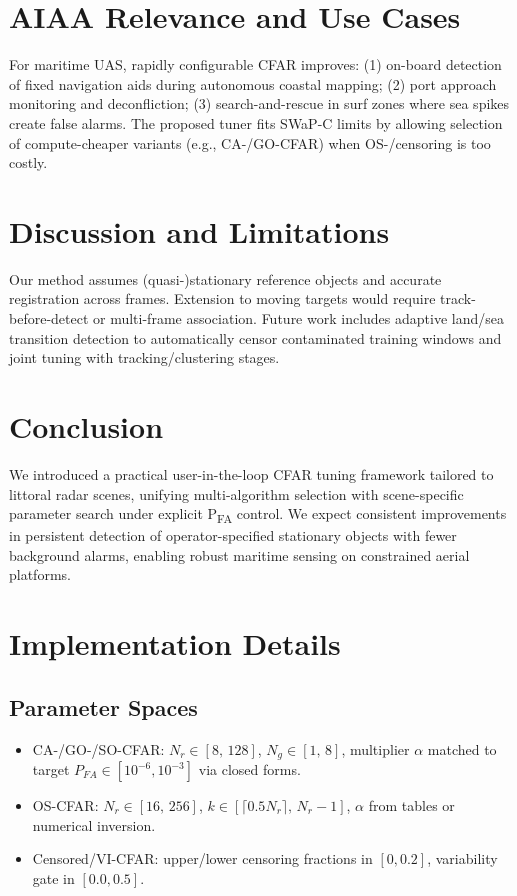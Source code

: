 \documentclass[10pt,letterpaper]{article}
\begin{document}
\section{AIAA Relevance and Use Cases}
For maritime UAS, rapidly configurable CFAR improves: (1) on-board detection of fixed navigation aids during autonomous coastal mapping; (2) port approach monitoring and deconfliction; (3) search-and-rescue in surf zones where sea spikes create false alarms. The proposed tuner fits SWaP-C limits by allowing selection of compute-cheaper variants (e.g., CA-/GO-CFAR) when OS-/censoring is too costly.

\section{Discussion and Limitations}
Our method assumes (quasi-)stationary reference objects and accurate registration across frames. Extension to moving targets would require track-before-detect or multi-frame association. Future work includes adaptive land/sea transition detection to automatically censor contaminated training windows and joint tuning with tracking/clustering stages.

\section{Conclusion}
We introduced a practical user-in-the-loop CFAR tuning framework tailored to littoral radar scenes, unifying multi-algorithm selection with scene-specific parameter search under explicit P\textsubscript{FA} control. We expect consistent improvements in persistent detection of operator-specified stationary objects with fewer background alarms, enabling robust maritime sensing on constrained aerial platforms.

\appendix
\section{Implementation Details}
\subsection{Parameter Spaces}
\begin{itemize}
  \item CA-/GO-/SO-CFAR: $N_r\in[8,\,128]$, $N_g\in[1,\,8]$, multiplier $\alpha$ matched to target $P_{FA} \in [10^{-6},10^{-3}]$ via closed forms.
  \item OS-CFAR: $N_r\in[16,\,256]$, $k\in[\lceil0.5N_r\rceil,\,N_r-1]$, $\alpha$ from tables or numerical inversion.
  \item Censored/VI-CFAR: upper/lower censoring fractions in $[0,0.2]$, variability gate in $[0.0,0.5]$.
\end{itemize}
\end{document}
